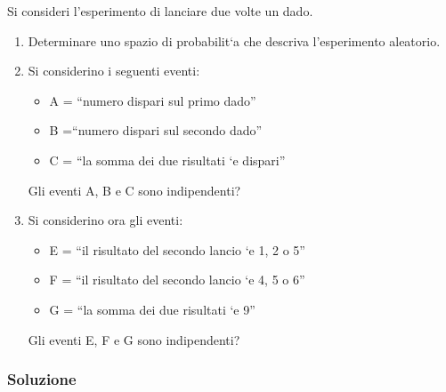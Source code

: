 Si consideri l’esperimento di lanciare due volte un dado.
\begin{enumerate}[label=(\alph*)]
\item Determinare uno spazio di probabilit‘a che descriva l’esperimento aleatorio.
  \item Si considerino i seguenti eventi:
\begin{itemize}
\item A = “numero dispari sul primo dado”
\item B =“numero dispari sul secondo dado”
\item C = “la somma dei due risultati ‘e dispari”
\end{itemize}
Gli eventi A, B e C sono indipendenti?
\item Si considerino ora gli eventi:
  \begin{itemize}
  \item E = “il risultato del secondo lancio ‘e 1, 2 o 5”
    \item F = “il risultato del secondo lancio ‘e 4, 5 o 6”
    \item G = “la somma dei due risultati ‘e 9”
  \end{itemize}
  Gli eventi E, F e G sono indipendenti?
\end{enumerate}

\subsubsection{Soluzione}

